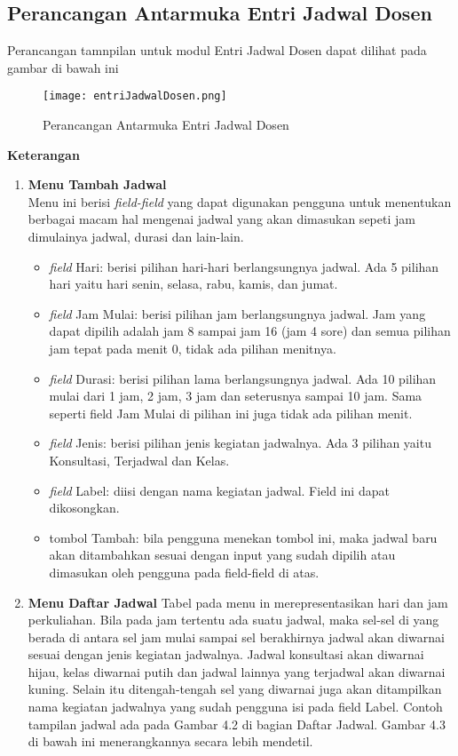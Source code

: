 \subsection{Perancangan Antarmuka Entri Jadwal Dosen}
Perancangan tamnpilan untuk modul Entri Jadwal Dosen dapat dilihat pada gambar di bawah ini
\begin{figure} [H]
	\centering  
	\texttt{[image: entriJadwalDosen.png]}
	\caption[Perancangan Antarmuka Entri Jadwal Dosen]{Perancangan Antarmuka Entri Jadwal Dosen} 
	\label{fig:flow-chart-CodeIgniter} 
\end{figure}
\textbf{Keterangan}
\begin{enumerate}
\item \textbf{Menu Tambah Jadwal}\\ Menu ini berisi\textit{ field-field} yang dapat digunakan pengguna untuk menentukan berbagai macam hal mengenai jadwal yang akan dimasukan sepeti jam dimulainya jadwal, durasi dan lain-lain.
	\begin{itemize}
		\item \textit{field} Hari: berisi pilihan hari-hari berlangsungnya jadwal. Ada 5 pilihan hari yaitu hari senin, selasa, rabu, kamis, dan jumat.
		\item \textit{field} Jam Mulai: berisi pilihan jam berlangsungnya jadwal. Jam yang dapat dipilih adalah jam 8 sampai jam 16 (jam 4 sore) dan semua 		pilihan jam tepat pada menit 0, tidak ada pilihan menitnya.
		\item \textit{field} Durasi: berisi pilihan lama berlangsungnya jadwal. Ada 10 pilihan mulai dari 1 jam, 2 jam, 3 jam dan seterusnya sampai 10 			jam. Sama seperti field Jam Mulai di pilihan ini juga tidak ada pilihan menit.
		\item \textit{field} Jenis: berisi pilihan jenis kegiatan jadwalnya. Ada 3 pilihan yaitu Konsultasi, Terjadwal dan Kelas.
		\item \textit{field} Label: diisi dengan nama kegiatan jadwal. Field ini dapat dikosongkan.
		\item tombol Tambah: bila pengguna menekan tombol ini, maka jadwal baru akan ditambahkan sesuai dengan input yang sudah dipilih atau dimasukan oleh pengguna pada field-field di atas.
	\end{itemize}
\item \textbf{Menu Daftar Jadwal} \newline
Tabel pada menu in merepresentasikan hari dan jam perkuliahan. Bila pada jam tertentu ada suatu jadwal, maka sel-sel di yang berada di antara sel jam mulai sampai sel berakhirnya jadwal akan diwarnai sesuai dengan jenis kegiatan jadwalnya. Jadwal konsultasi akan diwarnai hijau, kelas diwarnai putih dan jadwal lainnya yang terjadwal akan diwarnai kuning. Selain itu ditengah-tengah sel yang diwarnai juga akan ditampilkan nama kegiatan jadwalnya yang sudah pengguna isi pada field Label. Contoh tampilan jadwal ada pada Gambar 4.2 di bagian Daftar Jadwal. Gambar 4.3 di bawah ini menerangkannya secara lebih mendetil.

\end{enumerate}
